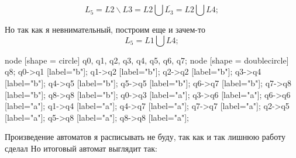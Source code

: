 \documentclass[fleqn]{article}
\begin{document}
\begin{equation}
    L_5= L2 \backslash L3 = L2 \bigcup \overline{L_3} = L2 \bigcup L4;
\end{equation}

Но так как я невнимательный, построим еще и зачем-то 
\begin{equation}
    L_5= L1 \bigcup L4;
\end{equation}

 {
    node [shape = circle] q0, q1, q2, q3, q4, q5, q6, q7;
    node [shape = doublecircle] q8;
    q0->q1 [label="b"];
    q1->q2 [label="b"];
    q2->q2 [label="b"];
    q3->q4 [label="b"];
    q4->q5 [label="b"];
    q5->q5 [label="b"];
    q6->q7 [label="b"];
    q7->q8 [label="b"];
    q8->q8 [label="b"];
    q0->q3 [label="a"];
    q3->q6 [label="a"];
    q6->q6 [label="a"];
    q1->q4 [label="a"];
    q4->q7 [label="a"];
    q7->q7 [label="a"];
    q2->q5 [label="a"];
    q5->q8 [label="a"];
    q8->q8 [label="a"];
}

Произведение автоматов я расписывать не буду, так как и так лишнюю работу сделал
Но итоговый автомат выглядит так:
\end{document}

